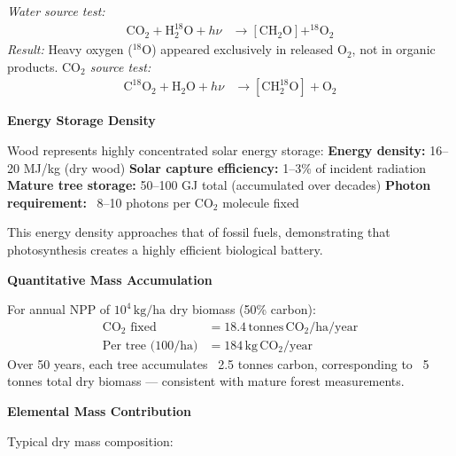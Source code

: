 \begin{technical}
\noindent\textit{Water source test:}
\begin{align*}
\mathrm{CO}_2 + \mathrm{H}_2^{18}\mathrm{O} + h\nu 
&\rightarrow [\mathrm{CH}_2\mathrm{O}] + ^{18}\mathrm{O}_2
\end{align*}
\textit{Result:} Heavy oxygen ($^{18}\mathrm{O}$) appeared exclusively in released $\mathrm{O}_2$, not in organic products.
\noindent\textit{$\mathrm{CO}_2$ source test:}
\begin{align*}
\mathrm{C}^{18}\mathrm{O}_2 + \mathrm{H}_2\mathrm{O} + h\nu 
&\rightarrow [\mathrm{CH}_2^{18}\mathrm{O}] + \mathrm{O}_2
\end{align*}

\vspace{0.5em}
\noindent\textbf{Energy Storage Density}

\vspace{0.2em}
\noindent Wood represents highly concentrated solar energy storage: \noindent\textbf{Energy density:} 16–20 MJ/kg (dry wood) \noindent\textbf{Solar capture efficiency:} 1–3\% of incident radiation \noindent\textbf{Mature tree storage:} 50–100 GJ total (accumulated over decades) \noindent\textbf{Photon requirement:} ~8–10 photons per $\mathrm{CO}_2$ molecule fixed

\vspace{0.3em}
\noindent This energy density approaches that of fossil fuels, demonstrating that photosynthesis creates a highly efficient biological battery.

\vspace{0.5em}
\noindent\textbf{Quantitative Mass Accumulation}

\vspace{0.2em}
\noindent For annual NPP of $10^4\,\mathrm{kg/ha}$ dry biomass (50\% carbon):
\begin{align*}
\text{$\mathrm{CO}_2$ fixed} &= 18.4\,\mathrm{tonnes}\,\mathrm{CO}_2/\mathrm{ha}/\mathrm{year} \\
\text{Per tree (100/ha)} &= 184\,\mathrm{kg}\,\mathrm{CO}_2/\mathrm{year}
\end{align*}
Over 50 years, each tree accumulates ~2.5 tonnes carbon, corresponding to ~5 tonnes total dry biomass — consistent with mature forest measurements.

\vspace{0.5em}
\noindent\textbf{Elemental Mass Contribution}

\vspace{0.2em}
\noindent Typical dry mass composition:


\end{technical}
